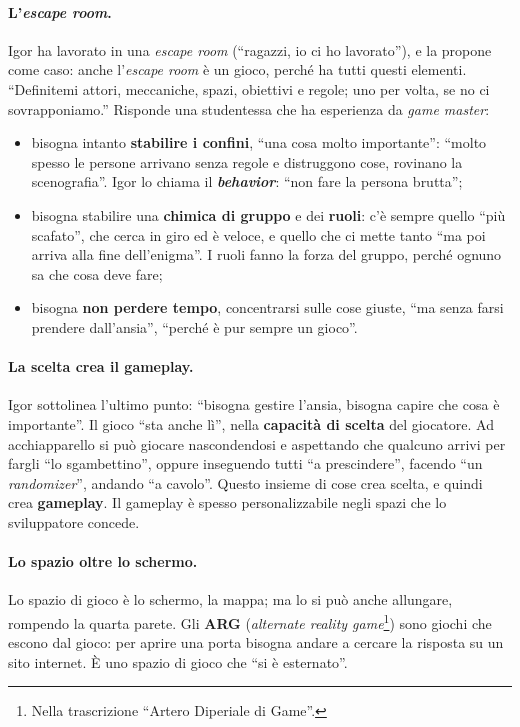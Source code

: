 \paragraph{L'\emph{escape room}.} Igor ha lavorato in una \emph{escape room} (``ragazzi,
io ci ho lavorato''), e la propone come caso: anche l'\emph{escape room} è un gioco,
perché ha tutti questi elementi. ``Definitemi attori, meccaniche, spazi, obiettivi e
regole; uno per volta, se no ci sovrapponiamo.'' Risponde una studentessa che ha
esperienza da \emph{game master}:
\begin{itemize}
  \item bisogna intanto \textbf{stabilire i confini}, ``una cosa molto importante'':
        ``molto spesso le persone arrivano senza regole e distruggono cose, rovinano la
        scenografia''. Igor lo chiama il \textbf{\emph{behavior}}: ``non fare la persona
        brutta'';
  \item bisogna stabilire una \textbf{chimica di gruppo} e dei \textbf{ruoli}: c'è
        sempre quello ``più scafato'', che cerca in giro ed è veloce, e quello che ci
        mette tanto ``ma poi arriva alla fine dell'enigma''. I ruoli fanno la forza del
        gruppo, perché ognuno sa che cosa deve fare;
  \item bisogna \textbf{non perdere tempo}, concentrarsi sulle cose giuste, ``ma senza
        farsi prendere dall'ansia'', ``perché è pur sempre un gioco''.
\end{itemize}

\paragraph{La scelta crea il gameplay.} Igor sottolinea l'ultimo punto: ``bisogna gestire
l'ansia, bisogna capire che cosa è importante''. Il gioco ``sta anche lì'', nella
\textbf{capacità di scelta} del giocatore. Ad acchiapparello si può giocare
nascondendosi e aspettando che qualcuno arrivi per fargli ``lo sgambettino'', oppure
inseguendo tutti ``a prescindere'', facendo ``un \emph{randomizer}'', andando ``a
cavolo''. Questo insieme di cose crea scelta, e quindi crea \textbf{gameplay}. Il
gameplay è spesso personalizzabile negli spazi che lo sviluppatore concede.

\paragraph{Lo spazio oltre lo schermo.} Lo spazio di gioco è lo schermo, la mappa; ma lo
si può anche allungare, rompendo la quarta parete. Gli \textbf{ARG}
(\emph{alternate reality game}\footnote{Nella trascrizione ``Artero Diperiale di
Game''.}) sono giochi che escono dal gioco: per aprire una porta bisogna andare a
cercare la risposta su un sito internet. È uno spazio di gioco che ``si è esternato''.

